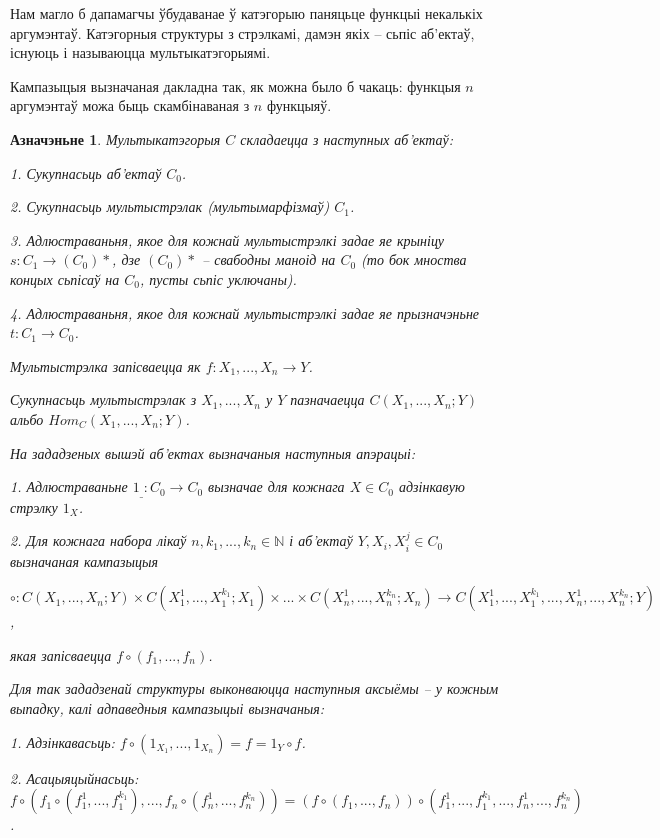 \documentclass[a4paper,12pt]{book}
\newtheorem{definition}{Азначэньне}[section]
\begin{document}
Нам магло б дапамагчы ўбудаванае ў катэгорыю паняцьце функцыі
некалькіх аргумэнтаў. Катэгорныя структуры з стрэлкамі, дамэн якіх --
сьпіс
аб'ектаў, існуюць і называюцца мультыкатэгорыямі.

Кампазыцыя вызначаная дакладна так, як можна было б чакаць: функцыя
$n$ аргумэнтаў можа быць скамбінаваная з $n$ функцыяў.

\begin{definition}
  Мультыкатэгорыя $C$ складаецца з наступных аб'ектаў:

  1. Сукупнасьць аб'ектаў $C_0$.

  2. Сукупнасьць мультыстрэлак (мультымарфізмаў) $C_1$.

  3. Адлюстраваньня, якое для кожнай мультыстрэлкі задае яе крыніцу
  $s: C_1 \rightarrow (C_0)*$, дзе $(C_0)*$ -- свабодны маноід на
  $C_0$ (то бок мноства концых сьпісаў на $C_0$, пусты сьпіс
  уключаны).

  4. Адлюстраваньня, якое для кожнай мультыстрэлкі задае яе
  прызначэньне $t: C_1 \rightarrow C_0$.

  Мультыстрэлка запісваецца як $f: X_1,...,X_n \rightarrow Y$.

  Сукупнасьць мультыстрэлак з $X_1, ..., X_n$ у $Y$ пазначаецца
  $C(X_1, ..., X_n;Y)$ альбо $Hom_C(X_1, ..., X_n;Y)$.

  На зададзеных вышэй аб'ектах вызначаныя наступныя апэрацыі:

  1. Адлюстраваньне $1_\_: C_0 \rightarrow C_0$ вызначае для кожнага
  $X \in C_0$ адзінкавую стрэлку $1_X$.

  2. Для кожнага набора лікаў $n, k_1, ..., k_n \in \mathbb{N}$ і
  аб'ектаў $Y, X_i, X_i^j \in C_0$ вызначаная кампазыцыя

  $\circ: C(X_1, ..., X_n; Y) \times C(X_1^1, ..., X_1^{k_1}; X_1)
  \times ... \times C(X_n^1, ..., X_n^{k_n}; X_n) \rightarrow C(X_1^1,
  ..., X_1^{k_1}, ..., X_n^1, ..., X_n^{k_n}; Y)$,

  якая запісваецца $f \circ (f_1, ..., f_n)$.

  Для так зададзенай структуры выконваюцца наступныя аксыёмы -- у
  кожным выпадку, калі адпаведныя кампазыцыі вызначаныя:

  1. Адзінкавасьць: $f \circ (1_{X_1}, ..., 1_{X_n}) = f = 1_Y \circ
  f$.

  2. Асацыяцыйнасьць: $f \circ (f_1 \circ (f_1^1, ..., f_1^{k_1}),
  ..., f_n \circ (f_n^1, ..., f_n^{k_n})) = (f \circ (f_1, ..., f_n))
  \circ (f_1^1, ..., f_1^{k_1}, ..., f_n^1, ..., f_n^{k_n})$.
\end{definition}
\end{document}
